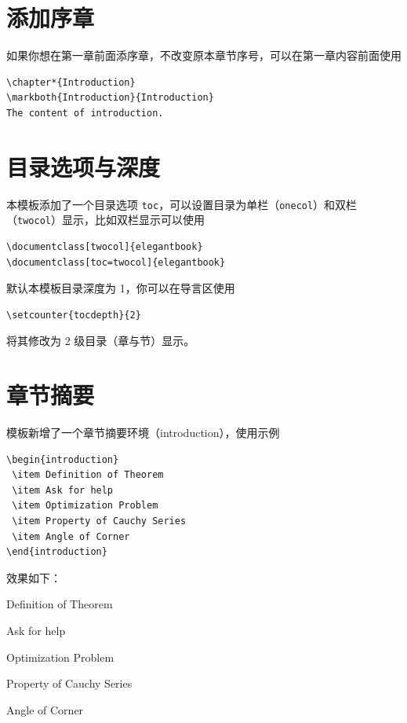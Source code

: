\documentclass[lang=cn,newtx,10pt,scheme=chinese,pad,twocol]{zznote}
\begin{document}
\section{添加序章}

如果你想在第一章前面添序章，不改变原本章节序号，可以在第一章内容前面使用
\begin{lstlisting}
\chapter*{Introduction}
\markboth{Introduction}{Introduction}
The content of introduction.
\end{lstlisting}

\section{目录选项与深度}
本模板添加了一个目录选项 \lstinline{toc}，可以设置目录为单栏（\lstinline{onecol}）和双栏（\lstinline{twocol}）显示，比如双栏显示可以使用
\begin{lstlisting}
\documentclass[twocol]{elegantbook}
\documentclass[toc=twocol]{elegantbook}
\end{lstlisting}

默认本模板目录深度为 1，你可以在导言区使用
\begin{lstlisting}
\setcounter{tocdepth}{2}
\end{lstlisting}
将其修改为 2 级目录（章与节）显示。


\section{章节摘要}
模板新增了一个章节摘要环境（introduction），使用示例
\begin{lstlisting}
\begin{introduction}
 \item Definition of Theorem
 \item Ask for help
 \item Optimization Problem
 \item Property of Cauchy Series
 \item Angle of Corner
\end{introduction}
\end{lstlisting}
效果如下：
\begin{introduction}
	\item Definition of Theorem
	\item Ask for help
	\item Optimization Problem
	\item Property of Cauchy Series
	\item Angle of Corner
\end{introduction}
\end{document}

